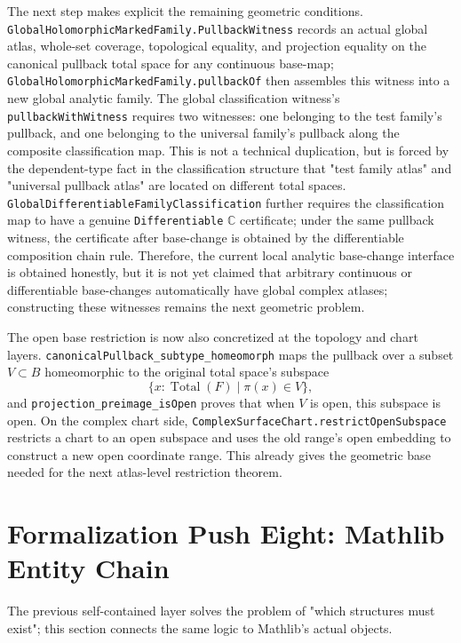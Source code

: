 \documentclass[UTF8,a4paper,11pt]{article}
\begin{document}
\par
The next step makes explicit the remaining geometric conditions.
\texttt{GlobalHolomorphic\allowbreak Marked\allowbreak Family\allowbreak.Pullback\allowbreak Witness} records an actual global atlas, whole-set coverage, topological equality, and projection equality on the canonical pullback total space for any continuous base-map;
\texttt{GlobalHolomorphic\allowbreak Marked\allowbreak Family\allowbreak.pullbackOf} then assembles this witness into a new global analytic family.
The global classification witness's \texttt{pullbackWithWitness} requires two witnesses: one belonging to the test family's pullback, and one belonging to the universal family's pullback along the composite classification map.
This is not a technical duplication, but is forced by the dependent-type fact in the classification structure that "test family atlas" and "universal pullback atlas" are located on different total spaces.
\texttt{GlobalDifferentiable\allowbreak Family\allowbreak Classification} further requires the classification map to have a genuine
\texttt{Differentiable\allowbreak} \(\mathbb C\) certificate; under the same pullback witness, the certificate after base-change is obtained by the differentiable composition chain rule.
Therefore, the current local analytic base-change interface is obtained honestly, but it is not yet claimed that arbitrary continuous or differentiable base-changes automatically have global complex atlases; constructing these witnesses remains the next geometric problem.
\par
The open base restriction is now also concretized at the topology and chart layers. \texttt{canonicalPullback\_subtype\_homeomorph} maps
the pullback over a subset \(V\subset B\) homeomorphic to the original total space's subspace
\[
  \{x:\operatorname{Total}(F)\mid \pi(x)\in V\},
\]
and \texttt{projection\_preimage\_isOpen} proves that when \(V\) is open, this subspace is open.
On the complex chart side, \texttt{ComplexSurfaceChart\allowbreak.restrictOpenSubspace} restricts a chart to an open subspace and uses the old range's open embedding to construct a new open coordinate range. This already gives the geometric base needed for the next atlas-level restriction theorem.

\section{Formalization Push Eight: Mathlib Entity Chain}

The previous self-contained layer solves the problem of "which structures must exist"; this section connects the same logic to Mathlib's actual objects.
\end{document}

